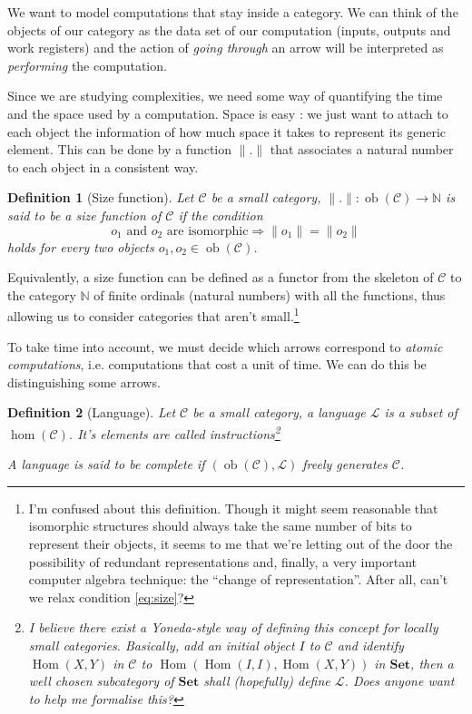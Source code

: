 \documentclass{article}
\newcommand{\cat}[1]{\mathscr{#1}}
\newcommand{\lcat}[1]{\mathbf{#1}}
\newcommand{\C}{\cat{C}}
\renewcommand{\L}{\cat{L}}
\newcommand{\size}[1]{\lVert#1\rVert}
\DeclareMathOperator{\ob}{ob}
\DeclareMathOperator{\Hom}{Hom}
\newcommand{\N}{\mathbb{N}}
\newtheorem{definition}{Definition}
\begin{document}
  We want to model computations that stay inside a category. We can
  think of the objects of our category as the data set of our
  computation (inputs, outputs and work registers) and the action of
  \emph{going through} an arrow will be interpreted as
  \emph{performing} the computation.
  
  Since we are studying complexities, we need some way of quantifying
  the time and the space used by a computation. Space is easy : we
  just want to attach to each object the information of how much space
  it takes to represent its generic element. This can be done by a
  function $\size{.}$ that associates a natural number to each object
  in a consistent way.

  \begin{definition}[Size function]
    Let $\C$ be a small category, $\size{.} : \ob(\C) \rightarrow \N$ is
    said to be a \emph{size function} of $\C$ if the condition
    \begin{equation}
      \label{eq:size}
      o_1 \text{ and } o_2 \text{ are isomorphic}
      \Rightarrow \size{o_1} = \size{o_2}
    \end{equation}
    holds for every two objects $o_1,o_2\in\ob(\C)$.
  \end{definition}
  
  Equivalently, a size function can be defined as a functor from the
  skeleton of $\C$ to the category $\N$ of finite ordinals (natural
  numbers) with all the functions, thus allowing us to consider
  categories that aren't small.\footnote{I'm confused about this
  definition. Though it might seem reasonable that isomorphic
  structures should always take the same number of bits to represent
  their objects, it seems to me that we're letting out of the door the
  possibility of redundant representations and, finally, a very
  important computer algebra technique: the ``change of
  representation''. After all, can't we relax condition
  \eqref{eq:size}?}

  To take time into account, we must decide which arrows correspond to
  \emph{atomic computations}, i.e. computations that cost a unit of
  time. We can do this be distinguishing some arrows.

  \begin{definition}[Language]
    Let $\C$ be a small category, a language $\L$ is a subset of
    $\hom(\C)$. It's elements are called
    \emph{instructions}\footnote{I believe there exist a Yoneda-style
    way of defining this concept for locally small
    categories. Basically, add an initial object $I$ to $\C$ and
    identify $\Hom(X,Y)$ in $\C$ to $\Hom\left(\Hom(I,I),
    \Hom(X,Y)\right)$ in $\lcat{Set}$, then a well chosen subcategory
    of $\lcat{Set}$ shall (hopefully) define $\L$. Does anyone want to
    help me formalise this?}
    
    A language is said to be \emph{complete} if $(\ob(\C),\L)$ freely
    generates $\C$.
  \end{definition}
\end{document}
